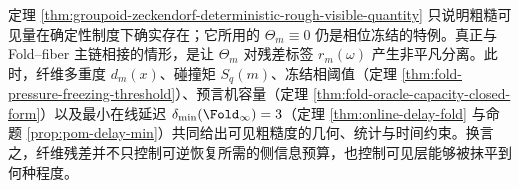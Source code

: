 \begin{remark}[残差相位与碰撞矩接口]\label{rem:groupoid-zeckendorf-rough-readout-fiber-interface}
定理 \ref{thm:groupoid-zeckendorf-deterministic-rough-visible-quantity} 只说明粗糙可见量在确定性制度下确实存在；它所用的 \(\Theta_m\equiv 0\) 仍是相位冻结的特例。真正与 Fold--fiber 主链相接的情形，是让 \(\Theta_m\) 对残差标签 \(r_m(\omega)\) 产生非平凡分离。此时，纤维多重度 \(d_m(x)\)、碰撞矩 \(S_q(m)\)、冻结相阈值（定理 \ref{thm:fold-pressure-freezing-threshold}）、预言机容量（定理 \ref{thm:fold-oracle-capacity-closed-form}）以及最小在线延迟 \(\delta_{\min}(\Fold_\infty)=3\)（定理 \ref{thm:online-delay-fold} 与命题 \ref{prop:pom-delay-min}）共同给出可见粗糙度的几何、统计与时间约束。换言之，纤维残差并不只控制可逆恢复所需的侧信息预算，也控制可见层能够被抹平到何种程度。
\end{remark}
